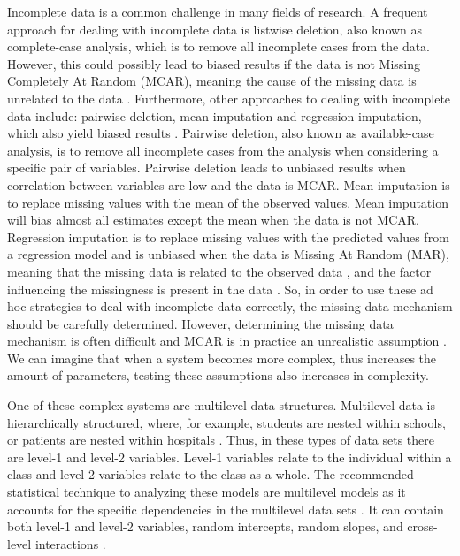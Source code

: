 \documentclass[10pt, a4paper, titlepage]{article}
\begin{document}
Incomplete data is a common challenge in many fields of research. A frequent approach for dealing with incomplete data is listwise deletion, also known as complete-case analysis, which is to remove all incomplete cases from the data. However, this could possibly lead to biased results if the data is not Missing Completely At Random (MCAR), meaning the cause of the missing data is unrelated to the data \citep{buurenFlexibleImputationMissing2018, kang2013, enders2017, austin2021, rubin1976}. Furthermore, other approaches to dealing with incomplete data include: pairwise deletion, mean imputation and regression imputation, which also yield biased results \citep{buurenFlexibleImputationMissing2018}. Pairwise deletion, also known as available-case analysis, is to remove all incomplete cases from the analysis when considering a specific pair of variables. Pairwise deletion leads to unbiased results when correlation between variables are low and the data is MCAR. Mean imputation is to replace missing values with the mean of the observed values. Mean imputation will bias almost all estimates except the mean when the data is not MCAR. Regression imputation is to replace missing values with the predicted values from a regression model and is unbiased when the data is Missing At Random (MAR), meaning that the missing data is related to the observed data \citep{rubin1976}, and the factor influencing the missingness is present in the data \citep{buurenFlexibleImputationMissing2018}. So, in order to use these ad hoc strategies to deal with incomplete data correctly, the missing data mechanism should be carefully determined. However, determining the missing data mechanism is often difficult and MCAR is in practice an unrealistic assumption \citep{buurenFlexibleImputationMissing2018}. We can imagine that when a system becomes more complex, thus increases the amount of parameters, testing these assumptions also increases in complexity.

One of these complex systems are multilevel data structures. Multilevel data is hierarchically structured, where, for example, students are nested within schools, or patients are nested within hospitals \citep{hox2017, hox2011}. Thus, in these types of data sets there are level-1 and level-2 variables. Level-1 variables relate to the individual within a class and level-2 variables relate to the class as a whole. The recommended statistical technique to analyzing these models are multilevel models as it accounts for the specific dependencies in the  multilevel data sets \citep{hox2017, hox2011, ludtke2017}. It can contain both level-1 and level-2 variables, random intercepts, random slopes, and cross-level interactions \citep{hox2017, hox2011}.
\end{document}

